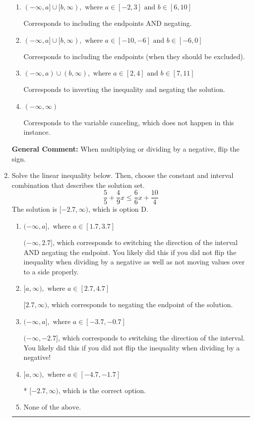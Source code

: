\documentclass{extbook}[14pt]
\newcommand{\litem}[1]{\item #1

\rule{\textwidth}{0.4pt}}
\begin{document}
\begin{enumerate}
{\begin{enumerate}[label=\Alph*.]
 * Correct option.
\item \( (-\infty, a] \cup [b, \infty), \text{ where } a \in [-2, 3] \text{ and } b \in [6, 10] \)

Corresponds to including the endpoints AND negating.
\item \( (-\infty, a] \cup [b, \infty), \text{ where } a \in [-10, -6] \text{ and } b \in [-6, 0] \)

Corresponds to including the endpoints (when they should be excluded).
\item \( (-\infty, a) \cup (b, \infty), \text{ where } a \in [2, 4] \text{ and } b \in [7, 11] \)

Corresponds to inverting the inequality and negating the solution.
\item \( (-\infty, \infty) \)

Corresponds to the variable canceling, which does not happen in this instance.
\end{enumerate}

\textbf{General Comment:} When multiplying or dividing by a negative, flip the sign.
}
\litem{
Solve the linear inequality below. Then, choose the constant and interval combination that describes the solution set.
\[ \frac{5}{5} + \frac{4}{9} x \leq \frac{6}{6} x + \frac{10}{4} \]
The solution is \( [-2.7, \infty) \), which is option D.\begin{enumerate}[label=\Alph*.]
\item \( (-\infty, a], \text{ where } a \in [1.7, 3.7] \)

 $(-\infty, 2.7]$, which corresponds to switching the direction of the interval AND negating the endpoint. You likely did this if you did not flip the inequality when dividing by a negative as well as not moving values over to a side properly.
\item \( [a, \infty), \text{ where } a \in [2.7, 4.7] \)

 $[2.7, \infty)$, which corresponds to negating the endpoint of the solution.
\item \( (-\infty, a], \text{ where } a \in [-3.7, -0.7] \)

 $(-\infty, -2.7]$, which corresponds to switching the direction of the interval. You likely did this if you did not flip the inequality when dividing by a negative!
\item \( [a, \infty), \text{ where } a \in [-4.7, -1.7] \)

* $[-2.7, \infty)$, which is the correct option.
\item \( \text{None of the above}. \)


\end{enumerate}}
\end{enumerate}
\end{document}
